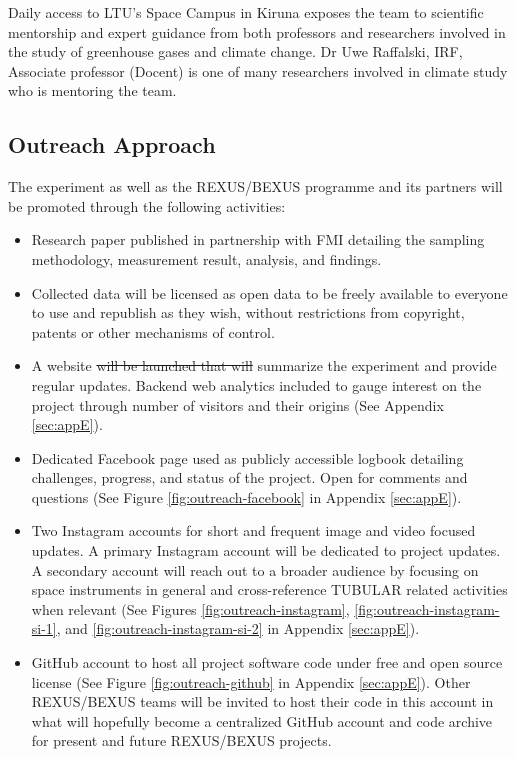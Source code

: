 \documentclass[a4paper,12pt,twoside]{article}
\providecommand{\DIFaddtex}[1]{{\protect\color{blue}\uwave{#1}}} %
\providecommand{\DIFdeltex}[1]{{\protect\color{red}\sout{#1}}}                      %
\providecommand{\DIFaddbegin}{} %
\providecommand{\DIFaddend}{} %
\providecommand{\DIFdelbegin}{} %
\providecommand{\DIFdelend}{} %
\providecommand{\DIFadd}[1]{\texorpdfstring{\DIFaddtex{#1}}{#1}} %
\providecommand{\DIFdel}[1]{\texorpdfstring{\DIFdeltex{#1}}{}} %
\newcommand{\DIFscaledelfig}{0.5}
\newlength{\DIFdelgraphicswidth} %
\newlength{\DIFdelgraphicsheight} %
\newcommand{\DIFaddincludegraphics}[2][]{{\color{blue}\fbox{\DIFOincludegraphics[#1]{#2}}}} %
\newcommand{\DIFdelincludegraphics}[2][]{%
\sbox{\DIFdelgraphicsbox}{\DIFOincludegraphics[#1]{#2}}%
\settoboxwidth{\DIFdelgraphicswidth}{\DIFdelgraphicsbox} %
\settoboxtotalheight{\DIFdelgraphicsheight}{\DIFdelgraphicsbox} %
\scalebox{\DIFscaledelfig}{%
\parbox[b]{\DIFdelgraphicswidth}{\usebox{\DIFdelgraphicsbox}\\[-\baselineskip] \rule{\DIFdelgraphicswidth}{0em}}\llap{\resizebox{\DIFdelgraphicswidth}{\DIFdelgraphicsheight}{%
\setlength{\unitlength}{\DIFdelgraphicswidth}%
\begin{picture}(1,1)%
\thicklines\linethickness{2pt} %
{\color[rgb]{1,0,0}\put(0,0){\framebox(1,1){}}}%
{\color[rgb]{1,0,0}\put(0,0){\line( 1,1){1}}}%
{\color[rgb]{1,0,0}\put(0,1){\line(1,-1){1}}}%
\end{picture}%
}\hspace*{3pt}}} %
} %
\DeclareRobustCommand{\DIFaddbegin}{\DIFOaddbegin \let\includegraphics\DIFaddincludegraphics} %
\DeclareRobustCommand{\DIFaddend}{\DIFOaddend \let\includegraphics\DIFOincludegraphics} %
\DeclareRobustCommand{\DIFdelbegin}{\DIFOdelbegin \let\includegraphics\DIFdelincludegraphics} %
\DeclareRobustCommand{\DIFdelend}{\DIFOaddend \let\includegraphics\DIFOincludegraphics} %
\begin{document}
Daily access to LTU's Space Campus in Kiruna exposes the team to scientific mentorship and expert guidance from both professors and researchers involved in the study of greenhouse gases and climate change. Dr Uwe Raffalski, IRF, Associate professor (Docent) is one of many researchers involved in climate study who is mentoring the team.
\pagebreak

\subsection{Outreach Approach}

The experiment as well as the REXUS/BEXUS programme and its partners will be promoted through the following activities:

\begin{itemize}
\item Research paper published in partnership with FMI detailing the sampling methodology, measurement result, analysis, and findings.
\item Collected data will be licensed as open data to be freely available to everyone to use and republish as they wish, without restrictions from copyright, patents or other mechanisms of control.
\item A website \DIFdelbegin \DIFdel{will be launched that will }\DIFdelend \DIFaddbegin \DIFadd{to }\DIFaddend summarize the experiment and provide regular updates. Backend web analytics included to gauge interest on the project through number of visitors and their origins (See Appendix \ref{sec:appE}).
\item Dedicated Facebook page used as publicly accessible logbook detailing challenges, progress, and status of the project. Open for comments and questions (See Figure \ref{fig:outreach-facebook} in Appendix \ref{sec:appE}).
\item Two Instagram accounts for short and frequent image and video focused updates. A primary Instagram account will be dedicated to project updates. A secondary account will reach out to a broader audience by focusing on space instruments in general and cross-reference TUBULAR related activities when relevant (See Figures \ref{fig:outreach-instagram}, \ref{fig:outreach-instagram-si-1}, and \ref{fig:outreach-instagram-si-2} in Appendix \ref{sec:appE}).
\item GitHub account to host all project software code under free and open source license (See Figure \ref{fig:outreach-github} in Appendix \ref{sec:appE}). Other REXUS/BEXUS teams will be invited to host their code in this account in what will hopefully become a centralized GitHub account and code archive for present and future REXUS/BEXUS projects.

\end{itemize}
\end{document}
